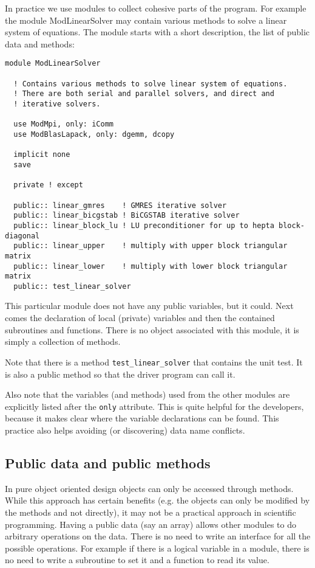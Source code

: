 \documentclass{article}
\begin{document}
In practice we use modules to collect cohesive parts of the program. 
For example the module ModLinearSolver may contain various methods to 
solve a linear system of equations. The module starts with a short 
description, the list of public data and methods:
\begin{verbatim}
module ModLinearSolver

  ! Contains various methods to solve linear system of equations.
  ! There are both serial and parallel solvers, and direct and 
  ! iterative solvers.

  use ModMpi, only: iComm
  use ModBlasLapack, only: dgemm, dcopy

  implicit none
  save

  private ! except

  public:: linear_gmres    ! GMRES iterative solver
  public:: linear_bicgstab ! BiCGSTAB iterative solver
  public:: linear_block_lu ! LU preconditioner for up to hepta block-diagonal 
  public:: linear_upper    ! multiply with upper block triangular matrix
  public:: linear_lower    ! multiply with lower block triangular matrix
  public:: test_linear_solver
\end{verbatim}
This particular module does not have any public variables, but it could.
Next comes the declaration of local (private) variables and then the 
contained subroutines and functions. There is no object associated with
this module, it is simply a collection of methods. 

Note that there is a method {\tt test\_linear\_solver} that contains the
unit test. It is also a public method so that the driver program can call it.

Also note that the variables (and methods) used from the other modules are 
explicitly listed after the {\tt only} attribute. 
This is quite helpful for the developers, because it makes clear where 
the variable declarations can be found. This practice also helps avoiding 
(or discovering) data name conflicts.

\subsection{Public data and public methods}

In pure object oriented design objects can only be accessed through methods.
While this approach has certain benefits (e.g. the objects can only be modified
by the methods and not directly), it may not be a practical approach in 
scientific programming. Having a public data (say an array) allows other
modules to do arbitrary operations on the data. There is no need to write
an interface for all the possible operations. For example if there is a logical
variable in a module, there is no need to write a subroutine to set it and
a function to read its value. 
\end{document}
